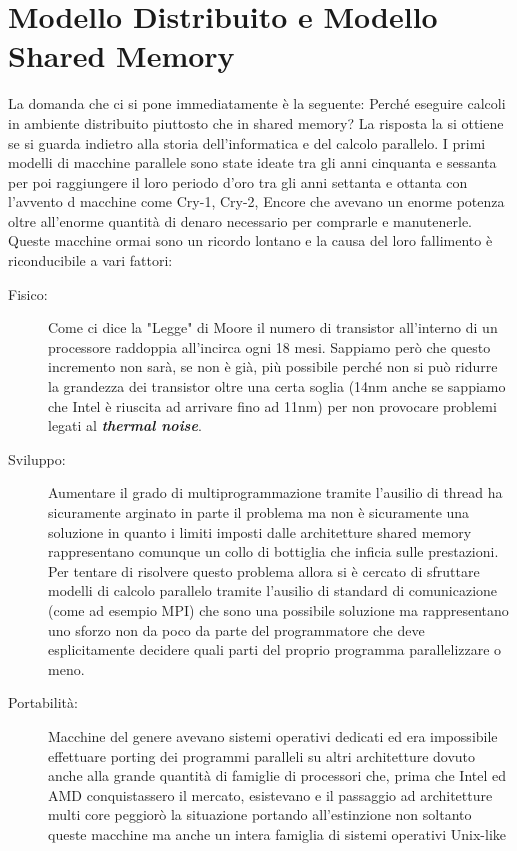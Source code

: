 \section{Modello Distribuito e Modello Shared Memory}
La domanda che ci si pone immediatamente è la seguente: Perché eseguire calcoli in ambiente distribuito piuttosto che in shared memory? La risposta la si ottiene se si guarda indietro alla storia dell'informatica e del calcolo parallelo. I primi modelli di macchine parallele sono state ideate tra gli anni cinquanta e sessanta per poi raggiungere il loro periodo d'oro tra gli anni settanta e ottanta con l'avvento d macchine come Cry-1, Cry-2, Encore che avevano un enorme potenza oltre all'enorme quantità di denaro necessario per comprarle e manutenerle. Queste macchine ormai sono un ricordo lontano e la causa del loro fallimento è riconducibile a vari fattori:
\begin{description}
    \item [Fisico:] Come ci dice la "Legge" di Moore il numero di transistor all'interno di un processore raddoppia all'incirca ogni 18 mesi. Sappiamo però che questo incremento non sarà, se non è già, più possibile perché non si può ridurre la grandezza dei transistor oltre una certa soglia (14nm anche se sappiamo che Intel è riuscita ad arrivare fino ad 11nm) per non provocare problemi legati al \textbf{\textit{thermal noise}}. 
    \item [Sviluppo:] Aumentare il grado di multiprogrammazione tramite l'ausilio di thread ha sicuramente arginato in parte il problema ma non è sicuramente una soluzione in quanto i limiti imposti dalle architetture shared memory rappresentano comunque un collo di bottiglia che inficia sulle prestazioni. Per tentare di risolvere questo problema allora si è cercato di sfruttare modelli di calcolo parallelo tramite l'ausilio di standard di comunicazione (come ad esempio MPI) che sono una possibile soluzione ma rappresentano uno sforzo non da poco da parte del programmatore che deve esplicitamente decidere quali parti del proprio programma parallelizzare o meno.
    \item[Portabilità:] Macchine del genere avevano sistemi operativi dedicati ed era impossibile effettuare porting dei programmi paralleli su altri architetture dovuto anche alla grande quantità di famiglie di processori che, prima che Intel ed AMD conquistassero il mercato, esistevano e il passaggio ad architetture multi core peggiorò la situazione portando all'estinzione non soltanto queste macchine ma anche un intera famiglia di sistemi operativi Unix-like
  \end{description}

